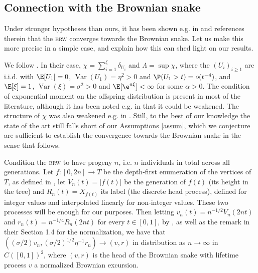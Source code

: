 \documentclass[10pt,a4paper]{article}
\newcommand{\todo}[1]{\textcolor{blue}{\textbf{TODO:} #1}}
\DeclareMathOperator{\Var}{Var}
\newcommand{\brw}{\textsc{brw}\xspace}
\begin{document}







\subsection{Connection with the Brownian snake}
\label{sec:snake}


Under stronger hypotheses than ours, it has been shown e.g. in \cite{janson2005convergence,miermont2008invarianceGW,raphaelis2017scaling} and references therein that the \brw converges towards the Brownian snake. Let us make this more precise in a simple case, and explain how this can shed light on our results. 

We follow \cite{janson2005convergence}. In their case, $\chi = \sum_{i=1}^\xi \delta_{U_i}$ and $\Lambda = \sup\chi$, where the $(U_i)_{i\geq 1}$ are i.i.d. with $\E[U_1]=0$, $\Var(U_1) = \eta^2 >0$ and $\P(U_1>t) = o(t^{-4})$, and $\E[\xi]=1$, $\Var(\xi) = \sigma^2 > 0$ and $\E[\e^{a\xi}]<\infty$ for some $\alpha>0$. The condition of exponential moment on the offspring distribution is present in most of the literature, although it has been noted e.g. in \cite{miermont2008invarianceGW} that it could be weakened. The structure of $\chi$ was also weakened e.g. in \cite{miermont2008invarianceGW}. Still, to the best of our knowledge the state of the art still falls short of our Assumptions \ref{assum}, which we conjecture are sufficient to establish the convergence towards the Brownian snake in the sense that follows. 

Condition the \brw to have progeny $n$, i.e. $n$ individuals in total across all generations. Let $f:[0,2n] \to T$ be the depth-first enumeration of the vertices of $T$, as defined in \cite[Section 1.3]{janson2005convergence}, let $V_n(t) = |f(t)|$ be the generation of $f(t)$ (its height in the tree) and $R_n(t) = X_{f(t)}$ its label (the discrete head process), defined for integer values and interpolated linearly for non-integer values. These two processes will be enough for our purposes. Then letting $v_n(t) = n^{-1/2} V_n(2nt)$ and $r_n(t) = n^{-1/4} R_n(2nt)$ for every $t\in [0,1]$, by \cite[Theorem 2 and Corollary 1]{janson2005convergence}, as well as the remark in their Section 1.4 for the normalization, we have that $((\sigma/2) v_n, (\sigma/2)^{1/2} \eta^{-1} r_n)\to (v,r)$ in distribution as $n\to\infty$ in $C([0,1])^2$, where $(v,r)$ is the head of the Brownian snake with lifetime process $v$ a normalized Brownian excursion. 
\end{document}
